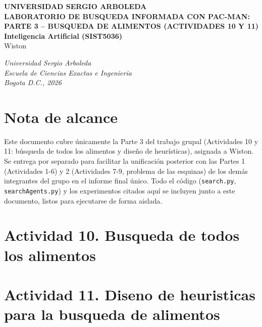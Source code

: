 \documentclass[12pt,a4paper]{article}
\begin{document}
\begin{titlepage}
\thispagestyle{empty}
\centering

\vspace*{0.5cm}
{\fontsize{13}{15}\selectfont\textbf{UNIVERSIDAD SERGIO ARBOLEDA}}\\[2.5cm]

{\fontsize{14}{17}\selectfont\textbf{LABORATORIO DE BUSQUEDA INFORMADA CON PAC-MAN:\\
PARTE 3 -- BUSQUEDA DE ALIMENTOS (ACTIVIDADES 10 Y 11)}}\\[3.5cm]

{\fontsize{12}{14}\selectfont\textbf{Inteligencia Artificial (SIST5036)}}\\[1.8cm]

{\fontsize{12}{14}\selectfont Wiston}\\[0.3cm]

\vfill

\begin{center}
    \textit{Universidad Sergio Arboleda}\\
    \textit{Escuela de Ciencias Exactas e Ingenieria}\\
    \textit{Bogota D.C., 2026}
\end{center}

\end{titlepage}

\newpage
\tableofcontents
\newpage

\section*{Nota de alcance}
Este documento cubre \'unicamente la Parte 3 del trabajo grupal (Actividades 10 y 11: b\'usqueda
de todos los alimentos y dise\~no de heur\'isticas), asignada a Wiston. Se entrega por separado
para facilitar la unificaci\'on posterior con las Partes 1 (Actividades 1-6) y 2 (Actividades 7-9,
problema de las esquinas) de los dem\'as integrantes del grupo en el informe final \'unico. Todo el
c\'odigo (\texttt{search.py}, \texttt{searchAgents.py}) y los experimentos citados aqu\'i se
incluyen junto a este documento, listos para ejecutarse de forma aislada.

\section{Actividad 10. Busqueda de todos los alimentos}


\section{Actividad 11. Diseno de heuristicas para la busqueda de alimentos}

\end{document}
